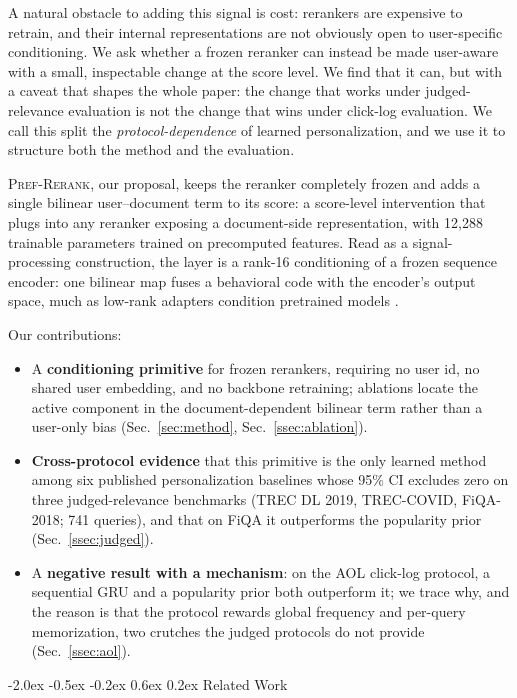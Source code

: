 \documentclass{article}
\makeatletter
\renewcommand{\section}{\@startsection {section}{1}{\z@}
  {-2.0ex \@plus -0.5ex \@minus -0.2ex}
  {0.6ex \@plus 0.2ex}
  {\normalfont\large\bfseries\centering}}
\makeatother
\begin{document}
A natural obstacle to adding this signal is cost: rerankers are
expensive to retrain, and their internal representations are not
obviously open to user-specific conditioning. We ask whether a frozen
reranker can instead be made user-aware with a small, inspectable
change at the score level. We find that it can, but with a caveat that
shapes the whole paper: the change that works under
judged-relevance evaluation is not the change that wins under
click-log evaluation. We call this split the
\emph{protocol-dependence} of learned personalization, and we use it
to structure both the method and the evaluation.

\textsc{Pref-Rerank}, our proposal, keeps the reranker completely
frozen and adds a single bilinear user--document term to its score: a
score-level intervention that plugs into any reranker exposing a
document-side representation, with 12,288 trainable parameters trained
on precomputed features. Read as a signal-processing construction, the
layer is a rank-16 conditioning of a frozen sequence encoder: one
bilinear map fuses a behavioral code with the encoder's output space,
much as low-rank adapters condition pretrained models \cite{lin2025personalized}.

Our contributions:
\begin{itemize}
\item A \textbf{conditioning primitive} for frozen
rerankers, requiring no user id, no shared user embedding, and no
backbone retraining; ablations locate the active component in the
document-dependent bilinear term rather than a user-only bias
(Sec.~\ref{sec:method}, Sec.~\ref{ssec:ablation}).
\item \textbf{Cross-protocol evidence} that this primitive is the only
learned method among six published personalization baselines whose
95\% CI excludes zero on three judged-relevance benchmarks (TREC DL
2019, TREC-COVID, FiQA-2018; 741 queries), and that on FiQA it
outperforms the popularity prior (Sec.~\ref{ssec:judged}).
\item A \textbf{negative result with a mechanism}: on the AOL
click-log protocol, a sequential GRU and a popularity prior both
outperform it; we trace why, and the reason is that the protocol
rewards global frequency and per-query memorization, two crutches the
judged protocols do not provide (Sec.~\ref{ssec:aol}).
\end{itemize}

\section{Related Work}
\label{sec:related}
\end{document}
